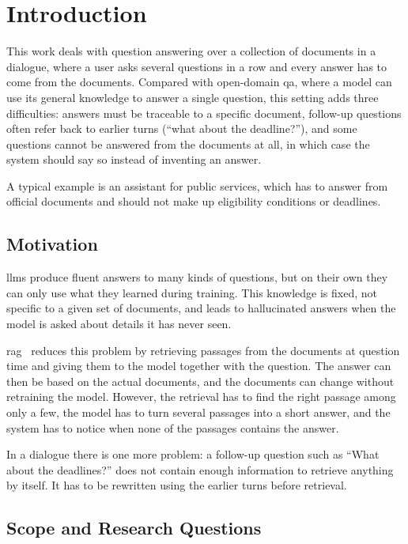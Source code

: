 
\chapter*{Introduction}\label{ch:introduction}

This work deals with question answering over a collection of documents in a dialogue,
where a user asks several questions in a row and every answer has to come from the
documents. Compared with open-domain \gls{qa}, where a model can use its general
knowledge to answer a single question, this setting adds three difficulties: answers
must be traceable to a specific document, follow-up questions often refer back to
earlier turns (``what about the deadline?''), and some questions cannot be answered from
the documents at all, in which case the system should say so instead of inventing an
answer.

A typical example is an assistant for public services, which has to answer from official
documents and should not make up eligibility conditions or deadlines.

\section*{Motivation}

\Glspl{llm} produce fluent answers to many kinds of questions, but on their own they
can only use what they learned during training. This knowledge is fixed, not specific to
a given set of documents, and leads to hallucinated answers when the model is asked
about details it has never seen.

\Gls{rag}~\cite{lewis2020rag} reduces this problem by retrieving passages from the
documents at question time and giving them to the model together with the question.
The answer can then be based on the actual documents, and the documents can change
without retraining the model. However, the retrieval has to find the right passage
among only a few, the model has to turn several passages into a short answer, and the
system has to notice when none of the passages contains the answer.

In a dialogue there is one more problem: a follow-up question such as ``What about the
deadlines?'' does not contain enough information to retrieve anything by itself. It has
to be rewritten using the earlier turns before retrieval.

\section*{Scope and Research Questions}

